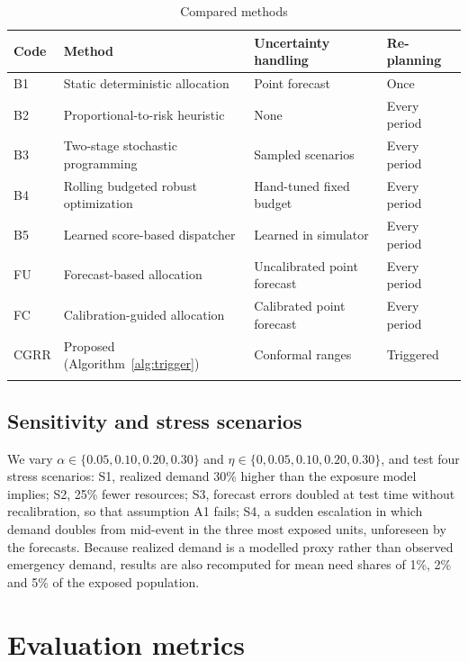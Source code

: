 \documentclass[pdflatex,sn-basic]{sn-jnl}
\theoremstyle{plain}%
\theoremstyle{remark}%
\theoremstyle{definition}%
\begin{document}
\begin{table}[h]
\caption{Compared methods}\label{tab:baselines}
\footnotesize
\begin{tabular*}{\textwidth}{@{\extracolsep\fill}llll}
\toprule
Code & Method & Uncertainty handling & Re-planning \\
\midrule
B1 & Static deterministic allocation & Point forecast & Once \\
B2 & Proportional-to-risk heuristic & None & Every period \\
B3 & Two-stage stochastic programming & Sampled scenarios & Every period \\
B4 & Rolling budgeted robust optimization & Hand-tuned fixed budget & Every period \\
B5 & Learned score-based dispatcher & Learned in simulator & Every period \\
FU & Forecast-based allocation & Uncalibrated point forecast & Every period \\
FC & Calibration-guided allocation & Calibrated point forecast & Every period \\
CGRR & Proposed (Algorithm~\ref{alg:trigger}) & Conformal ranges & Triggered \\
\botrule
\end{tabular*}
\end{table}

\subsection{Sensitivity and stress scenarios}

We vary $\alpha \in \{0.05, 0.10, 0.20, 0.30\}$ and $\eta \in \{0, 0.05, 0.10, 0.20, 0.30\}$, and test four stress scenarios: S1, realized demand 30\% higher than the exposure model implies; S2, 25\% fewer resources; S3, forecast errors doubled at test time without recalibration, so that assumption A1 fails; S4, a sudden escalation in which demand doubles from mid-event in the three most exposed units, unforeseen by the forecasts. Because realized demand is a modelled proxy rather than observed emergency demand, results are also recomputed for mean need shares of 1\%, 2\% and 5\% of the exposed population.

\section{Evaluation metrics}\label{sec:metrics}
\end{document}
